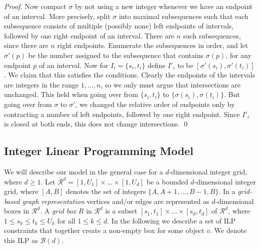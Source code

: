 \documentclass[runningheads]{llncs}
\newcounter{constr}
\begin{document}
\begin{proof}
Now compact $\sigma$ by not using a new integer whenever we have
an endpoint of an interval.  More precisely, split $\sigma$ into
maximal subsequences such that each subsequence consists of multiple
(possibly none) left endpoints of intervals, followed by one right
endpoint of an interval.
There are 
$n$ such subsequences, since there are $n$ right endpoints.
Enumerate the subsequences in order, and let $\sigma'(p)$ be
the number assigned to the subsequence that contains $\sigma(p)$,
for any endpoint $p$ of an interval.
Now for $I_i=\{s_i,t_i\}$ 
define $I'_i$ to be $\left[\sigma'(s_i),\sigma'(t_i)\right]$.  We
claim
that this satisfies the conditions.  Clearly the endpoints of the
intervals
are integers in the range $1,\dots,n$, so we only must 
argue that intersections are unchanged.
This held when going over from $\{s_i,t_i\}$ to
$\{\sigma(s_i),\sigma(t_i)\}$.
But going over from $\sigma$ to $\sigma'$, we changed the relative
order 
of endpoints only by contracting a number
of left endpoints, followed by one right endpoint.  Since 
$I'_i$ is closed at both ends, this does not change intersections.
\qed
\end{proof}


\subsection{Integer Linear Programming Model}\label{sec:ilpmodel}
We will describe our model in the general case for a $d$-dimensional
integer grid, where $d \ge 1$. Let $\mathcal R^d = [1,U_1] \times
\ldots \times [1, U_d]$ be a bounded $d$-dimensional integer grid,
where $[A,B]$ denotes the set of integers $\{A, A+1, \dots, B-1,B\}$.
In a \emph{grid-based graph representation} vertices and/or edges are
represented as $d$-dimensional boxes in $\mathcal{R}^d$. A \emph{grid
box} $R$ in $\mathcal R^d$ is a subset $[s_1,t_1] \times \ldots \times
[s_d, t_d]$ of $\mathcal R^d$, where $1 \le s_k \le t_k \le U_k$ for
all $1 \le k \le d$. In the following we describe a set of ILP
constraints that together create a non-empty box for some object  $v$.
 We denote this ILP as $\mathcal B(d)$.
\end{document}
